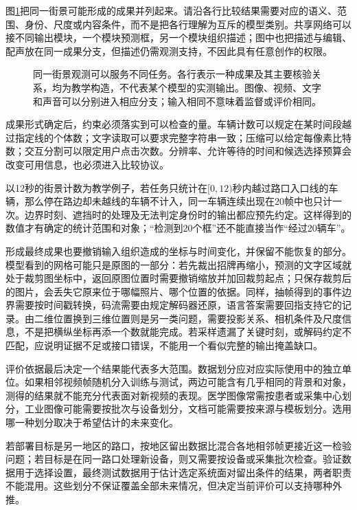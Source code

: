 图\ref{fig:vision-task-map}把同一街景可能形成的成果并列起来。请沿各行比较结果需要对应的语义、范围、身份、尺度或内容条件，而不是把各行理解为互斥的模型类别。共享网络可以接不同输出模块，一个模块预测框，另一个模块组织描述；图中也把描述与编辑、配声放在同一成果分支，但描述仍需观测支持，不因此具有任意创作的权限。

\begin{figure}[htbp]
  \centering
  
  \caption{同一街景观测可以服务不同任务。各行表示一种成果及其主要核验关系，均为教学构造，不代表某个模型的实测输出。图像、视频、文字和声音可以分别进入相应分支；输入相同不意味着监督或评价相同。}
  \label{fig:vision-task-map}
\end{figure}

成果形式确定后，约束必须落实到可以检查的量。车辆计数可以规定在某时间段越过指定线的个体数；文字读取可以要求完整字符串一致；压缩可以给定每像素比特数；交互分割可以限定用户点击次数。分辨率、允许等待的时间和候选选择预算会改变可用信息，也必须进入比较协议。

以12秒的街景计数为教学例子，若任务只统计在$[0,12)$秒内越过路口入口线的车辆，那么停在路边却未越线的车辆不计入，同一车辆连续出现在20帧中也只计一次。边界时刻、遮挡时的处理及无法判定身份时的输出都应预先约定。这样得到的数值才有确定的统计范围和对象；“检测到20个框”还不能直接当作“经过20辆车”。

形成最终成果也要撤销输入组织造成的坐标与时间变化，并保留不能恢复的部分。模型看到的网格可能只是原图的一部分：若先裁出招牌再缩小，预测的文字区域就处于裁剪图坐标中，返回原图位置时需要撤销缩放并加回裁剪起点；只保存裁剪后的图片，会丢失它原来位于哪幅照片、哪个位置的依据。同样，抽帧得到的事件边界需要按时间戳转换，码流需要由规定解码器还原，语言答案需要回指支持它的记录。由二维位置换到三维位置则是另一类问题，需要投影关系、相机条件及尺度信息，不是把横纵坐标再添一个数就能完成。若采样遗漏了关键时刻，或解码约定不匹配，应说明证据不足或接口错误，不能用一个看似完整的输出掩盖缺口。

评价依据最后决定一个结果能代表多大范围。数据划分应对应实际使用中的独立单位。如果相邻视频帧随机分入训练与测试，两边可能含有几乎相同的背景和对象，测得的结果就不能充分代表面对新视频的表现。医学图像常需按患者或采集中心划分，工业图像可能需要按批次与设备划分，文档可能需要按来源与模板划分。选用哪一种划分取决于希望估计的未来变化。

若部署目标是另一地区的路口，按地区留出数据比混合各地相邻帧更接近这一检验问题；若目标是在同一路口处理新设备，则又需要按设备或采集批次检查。验证数据用于选择设置，最终测试数据用于估计选定系统面对留出条件的结果，两者职责不能混用。这些划分不保证覆盖全部未来情况，但决定当前评价可以支持哪种外推。

